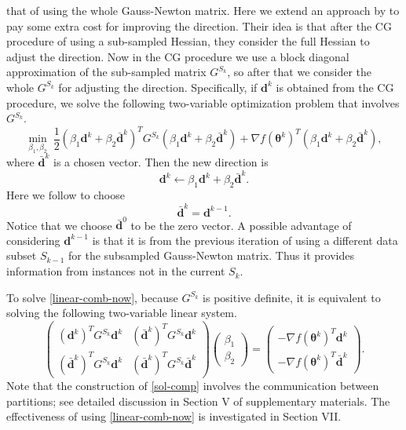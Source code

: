 \documentclass[12pt]{article}
\newcounter{bar}
\def\bd{{\boldsymbol d}}
\def\btheta{\boldsymbol \theta}
\begin{document}
that of using the whole Gauss-Newton matrix. Here we extend an approach by \cite{CCW15a} to pay some extra cost for improving the direction.
Their idea is that after the CG procedure of using a sub-sampled Hessian, they consider the full Hessian to adjust the direction. Now in the CG procedure we use a block diagonal approximation of the sub-sampled matrix $G^{S_k}$, so after that we consider the whole $G^{S_k}$ for adjusting the direction. Specifically, if $\bd^k$ is obtained from the CG procedure, we solve the following two-variable optimization problem that involves $G^{S_k}$.
\begin{equation}
\label{linear-comb-now}
\min_{\beta_1,\beta_2}\; \frac{1}{2} (\beta_1 \bd^k + \beta_2 \bar{\bd}^k)^T G^{S_k} (\beta_1 \bd^k + \beta_2 \bar{\bd}^k) + \nabla f(\btheta^k)^T (\beta_1 \bd^k + \beta_2 \bar{\bd}^k),
\end{equation}
where $\bar{\bd}^k$ is a chosen vector. Then the new direction is
\begin{equation*}
\bd^k \leftarrow \beta_1 \bd^k + \beta_2 \bar{\bd}^k.
\end{equation*}
Here we follow \cite{CCW15a} to choose
\begin{equation*}
\bar{\bd}^k = \bd^{k-1}.
\end{equation*}
Notice that we choose $\bar{\bd}^0$ to be the zero vector. A possible advantage of considering $\bd^{k-1}$ is that it is from the previous iteration of using
a different data subset $S_{k-1}$ for the subsampled Gauss-Newton matrix. Thus it provides information from instances not in the current $S_k$.
\par To solve \eqref{linear-comb-now}, because $G^{S_k}$ is positive definite, it is equivalent to solving the following two-variable linear system.
\begin{equation}
\label{sol-comp}
\left(
\begin{array}{cccc}
(\bd^k)^T G^{S_k} \bd^k & (\bar{\bd}^k)^T G^{S_k} \bd^k\\
(\bar{\bd}^k)^T G^{S_k} \bd^k & (\bar{\bd}^k)^T G^{S_k} \bar{\bd}^k
\end{array} \right) \left(\begin{array}{cccc}\beta_1 \\ \beta_2 \end{array} \right)
= \left(\begin{array}{cccc} -\nabla f(\btheta^k)^T \bd^k \\ -\nabla f(\btheta^k)^T \bar{\bd}^k \end{array} \right).
\end{equation}
Note that the construction of \eqref{sol-comp} involves 
the communication between partitions; see detailed
discussion in Section V of 
supplementary materials. The effectiveness of using
\eqref{linear-comb-now} is investigated in Section
VII.
\end{document}
